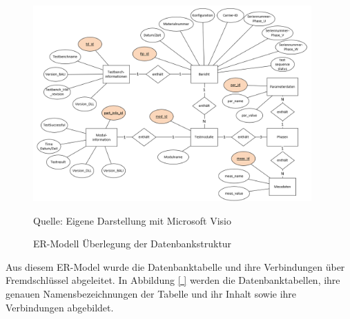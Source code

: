 \begin{figure}[H]
    \centering
    \includegraphics[width=0.95\textwidth]{Grafiken/Bild von ER-Modell}
    \caption{ER-Modell Überlegung der Datenbankstruktur}
    \label{fig: ER-Modell Überlegung der Datenbankstruktur}
    {Quelle: Eigene Darstellung mit Microsoft Visio}
\end{figure}

Aus diesem ER-Model wurde die Datenbanktabelle und ihre Verbindungen über Fremdschlüssel abgeleitet. In Abbildung \ref{ }
werden die Datenbanktabellen, ihre genauen Namensbezeichnungen der Tabelle und ihr Inhalt sowie ihre Verbindungen abgebildet.

